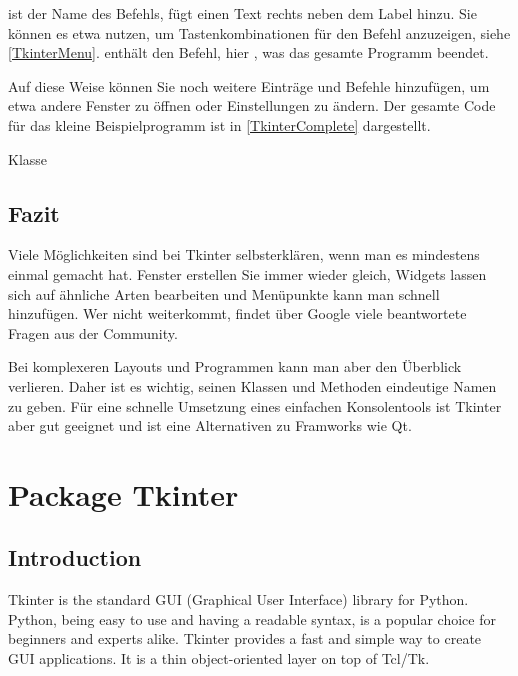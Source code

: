 ist der Name des Befehls,  fügt einen Text rechts neben dem Label hinzu. Sie können es etwa nutzen, um Tastenkombinationen für den Befehl anzuzeigen, siehe \ref{TkinterMenu}.  enthält den Befehl, hier , was das gesamte Programm beendet.

Auf diese Weise können Sie noch weitere Einträge und Befehle hinzufügen, um etwa andere Fenster zu öffnen oder Einstellungen zu ändern. Der gesamte Code für das kleine Beispielprogramm ist in \ref{TkinterComplete} dargestellt.

\begin{code}
     
    \caption{Klasse }\label{TkinterComplete}
\end{code}   

\subsection{Fazit}

Viele Möglichkeiten sind bei Tkinter selbsterklären, wenn man es mindestens einmal gemacht hat. Fenster erstellen Sie immer wieder gleich, Widgets lassen sich auf ähnliche Arten bearbeiten und Menüpunkte kann man schnell hinzufügen. Wer nicht weiterkommt, findet über Google viele beantwortete Fragen aus der Community.

Bei komplexeren Layouts und Programmen kann man aber den Überblick verlieren. Daher ist es wichtig, seinen Klassen und Methoden eindeutige Namen zu geben. Für eine schnelle Umsetzung eines einfachen Konsolentools ist Tkinter aber gut geeignet und ist eine Alternativen zu Framworks wie Qt.


\section{Package Tkinter}

\subsection{Introduction}

Tkinter is the standard GUI (Graphical User Interface) library for Python. Python, being easy to use and having a readable syntax, is a popular choice for beginners and experts alike. Tkinter provides a fast and simple way to create GUI applications. It is a thin object-oriented layer on top of Tcl/Tk.


